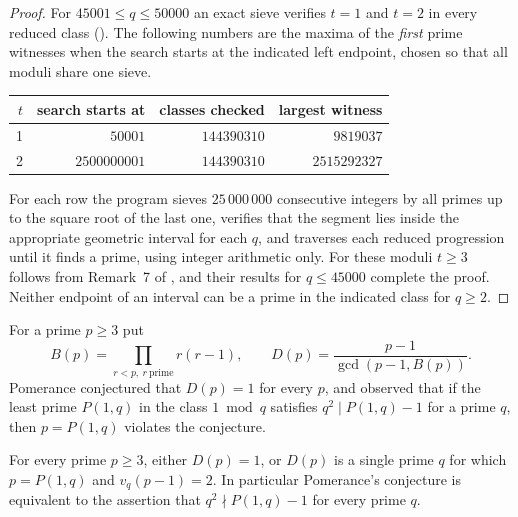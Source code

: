 \begin{proof}
For $45001\le q\le50000$ an exact sieve verifies $t=1$ and $t=2$ in every reduced
class (). The
following numbers are the maxima of the \emph{first} prime witnesses when the search
starts at the indicated left endpoint, chosen so that all moduli share one sieve.
\begin{center}
\begin{tabular}{rrrr}
$t$ & search starts at & classes checked & largest witness\\ \hline
1 & $50001$ & $144390310$ & $9819037$\\
2 & $2500000001$ & $144390310$ & $2515292327$
\end{tabular}
\end{center}
For each row the program sieves $25\,000\,000$ consecutive integers by all primes up to
the square root of the last one, verifies that the segment lies inside the appropriate
geometric interval for each $q$, and traverses each reduced progression until it finds
a prime, using integer arithmetic only. For these moduli $t\ge3$ follows from Remark~7
of \cite{BarthelMuller2022Geometric}, and their results for $q\le45000$ complete the
proof. Neither endpoint of an interval can be a prime in the indicated class for
$q\ge2$.
\end{proof}

For a prime $p\ge3$ put
\[
 B(p)=\prod_{r<p,\ r\ \mathrm{prime}}r(r-1),\qquad
 D(p)=\frac{p-1}{\gcd(p-1,B(p))}.
\]
Pomerance \cite{Pomerance1974Carmichael} conjectured that $D(p)=1$ for every $p$, and
observed that if the least prime $P(1,q)$ in the class $1\bmod q$ satisfies
$q^2\mid P(1,q)-1$ for a prime $q$, then $p=P(1,q)$ violates the conjecture.

\begin{theorem}\label{dir:thm:pomerance}
For every prime $p\ge3$, either $D(p)=1$, or $D(p)$ is a single prime $q$ for which
$p=P(1,q)$ and $v_q(p-1)=2$. In particular Pomerance's conjecture is equivalent to the
assertion that $q^2\nmid P(1,q)-1$ for every prime $q$.
\end{theorem}

